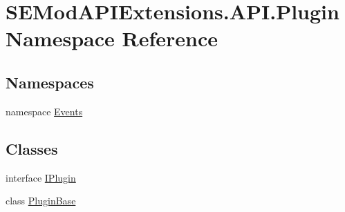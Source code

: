 \hypertarget{namespace_s_e_mod_a_p_i_extensions_1_1_a_p_i_1_1_plugin}{}\section{S\+E\+Mod\+A\+P\+I\+Extensions.\+A\+P\+I.\+Plugin Namespace Reference}
\label{namespace_s_e_mod_a_p_i_extensions_1_1_a_p_i_1_1_plugin}
\subsection*{Namespaces}
\begin{DoxyCompactItemize}
\item 
namespace \hyperlink{namespace_s_e_mod_a_p_i_extensions_1_1_a_p_i_1_1_plugin_1_1_events}{Events}
\end{DoxyCompactItemize}
\subsection*{Classes}
\begin{DoxyCompactItemize}
\item 
interface \hyperlink{interface_s_e_mod_a_p_i_extensions_1_1_a_p_i_1_1_plugin_1_1_i_plugin}{I\+Plugin}
\item 
class \hyperlink{class_s_e_mod_a_p_i_extensions_1_1_a_p_i_1_1_plugin_1_1_plugin_base}{Plugin\+Base}
\end{DoxyCompactItemize}
